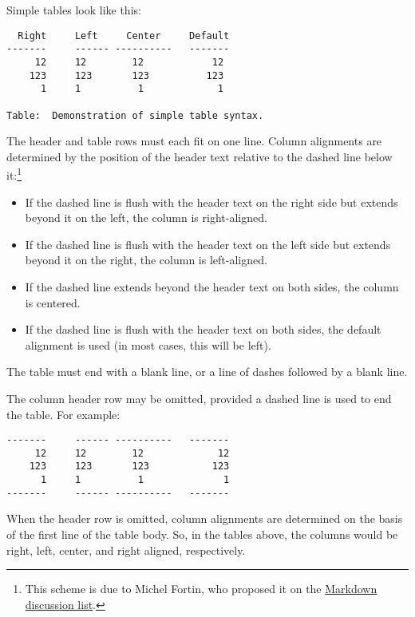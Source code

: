 \documentclass[
]{article}
\providecommand{\tightlist}{%
  \setlength{\itemsep}{0pt}\setlength{\parskip}{0pt}}
\begin{document}
Simple tables look like this:

\begin{verbatim}
  Right     Left     Center     Default
-------     ------ ----------   -------
     12     12        12            12
    123     123       123          123
      1     1          1             1

Table:  Demonstration of simple table syntax.
\end{verbatim}

The header and table rows must each fit on one line. Column alignments
are determined by the position of the header text relative to the dashed
line below it:\footnote{This scheme is due to Michel Fortin, who
  proposed it on the
  \href{http://six.pairlist.net/pipermail/markdown-discuss/2005-March/001097.html}{Markdown
  discussion list}.}

\begin{itemize}
\tightlist
\item
  If the dashed line is flush with the header text on the right side but
  extends beyond it on the left, the column is right-aligned.
\item
  If the dashed line is flush with the header text on the left side but
  extends beyond it on the right, the column is left-aligned.
\item
  If the dashed line extends beyond the header text on both sides, the
  column is centered.
\item
  If the dashed line is flush with the header text on both sides, the
  default alignment is used (in most cases, this will be left).
\end{itemize}

The table must end with a blank line, or a line of dashes followed by a
blank line.

The column header row may be omitted, provided a dashed line is used to
end the table. For example:

\begin{verbatim}
-------     ------ ----------   -------
     12     12        12             12
    123     123       123           123
      1     1          1              1
-------     ------ ----------   -------
\end{verbatim}

When the header row is omitted, column alignments are determined on the
basis of the first line of the table body. So, in the tables above, the
columns would be right, left, center, and right aligned, respectively.
\end{document}
